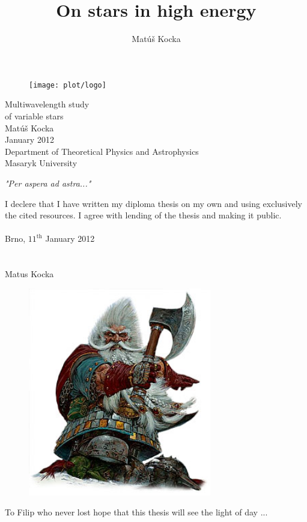 \documentclass[oneside,a4paper,11pt]{report}
\title{On stars in high energy }
\author{Matúš Kocka}
\begin{document}
\thispagestyle{empty}
\begin{figure}
\begin{center}
\texttt{[image: plot/logo]}
\end{center}
\end{figure}
\begin{center}

\vspace{2cm}
\Large 

\Huge Multiwavelength study \\ 
of variable stars \\
\vspace{1cm}
\Large Matúš Kocka \\
\Large January 2012 \\
\vspace{2cm}
\LARGE Department of Theoretical Physics and Astrophysics \\
Masaryk University
\end{center}
\pagebreak
\thispagestyle{empty}



\textit{"Per aspera ad astra..."}

\vfill
I declere that I have written my diploma thesis on my own and using exclusively the cited resources. I agree with lending of the thesis and
making it public. \\
\\

 Brno, $\mathrm{11^{th}}$ January 2012 \\
\\
\\
 Matus Kocka

 

\pagebreak
\thispagestyle{empty}
\vspace{4cm}



\noindent
\begin{figure}[!htbp]
	\centering
	\includegraphics[width=8cm]{the-white-dwarf}
\end{figure}
\vfill
To Filip who never lost hope that this thesis will see the light of day  ...  
\end{document}
